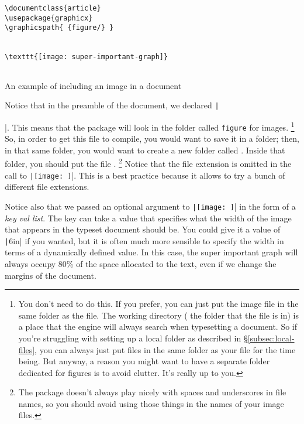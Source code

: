 \begin{listing}[htbp]
	\centering
	\begin{verbatim}
\documentclass{article}
\usepackage{graphicx}
\graphicspath{ {figure/} }


\texttt{[image: super-important-graph]}


	\end{verbatim}
	\caption{An example of including an image in a document}
	\label{lst:image-example}
\end{listing}

Notice that in the preamble of the document, we declared \texttt|\graphicspath{ {figure/} }|.
This means that the package  will look in the folder called \texttt{figure} for images.%
\footnote{%
You don't need to do this.
If you prefer, you can just put the image file in the same folder as the  file.
The working directory (\IE{} the folder that the  file is in) is a place that the engine will always search when typesetting a document.
So if you're struggling with setting up a local  folder as described in \S\ref{subsec:local-files}, you can always just put files in the same folder as your  file for the time being.
But anyway, a reason you might want to have a separate folder dedicated for figures is to avoid clutter.
It's really up to you.%
}
So, in order to get this  file to compile, you would want to save it in a folder; then, in that same folder, you would want to create a new folder called .
Inside that folder, you should put the file .%
\footnote{%
The package  doesn't always play nicely with spaces and underscores in file names, so you should avoid using those things in the names of your image files.%
}
Notice that the file extension is omitted in the call to \texttt|\texttt{[image: ]}|.
This is a best practice because it allows  to try a bunch of different file extensions.

Notice also that we passed an optional argument to \texttt|\texttt{[image: ]}| in the form of a \textit{key val list}.
The key  can take a value that specifies what the width of the image that appears in the typeset document should be.
You could give it a value of \texttt|6in| if you wanted, but it is often much more sensible to specify the width in terms of a dynamically defined value.
In this case, the super important graph will always occupy 80\% of the space allocated to the text, even if we change the margins of the document.

